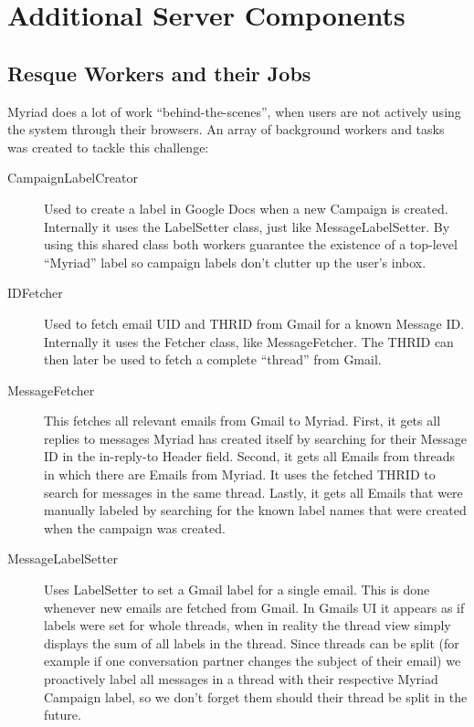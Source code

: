 \section{Additional Server Components}

\subsection{Resque Workers and their Jobs}

Myriad does a lot of work ``behind-the-scenes'', when users are not actively using the system through their browsers. An array of background workers and tasks was created to tackle this challenge:

\begin{description}

\item[CampaignLabelCreator] Used to create a label in Google Docs when a new Campaign is created. Internally it uses the LabelSetter class, just like MessageLabelSetter. By using this shared class both workers guarantee the existence of a top-level ``Myriad'' label so campaign labels don't clutter up the user's inbox.

\item[IDFetcher] Used to fetch email UID and THRID from Gmail for a known Message ID. Internally it uses the Fetcher class, like MessageFetcher. The THRID can then later be used to fetch a complete ``thread'' from Gmail.

\item[MessageFetcher] This fetches all relevant emails from Gmail to Myriad. First, it gets all replies to messages Myriad has created itself by searching for their Message ID in the in-reply-to Header field. Second, it gets all Emails from threads in which there are Emails from Myriad. It uses the fetched THRID to search for messages in the same thread. Lastly, it gets all Emails that were manually labeled by searching for the known label names that were created when the campaign was created.

\item[MessageLabelSetter] Uses LabelSetter to set a Gmail label for a single email. This is done whenever new emails are fetched from Gmail. In Gmails UI it appears as if labels were set for whole threads, when in reality the thread view simply displays the sum of all labels in the thread. Since threads can be split (for example if one conversation partner changes the subject of their email) we proactively label all messages in a thread with their respective Myriad Campaign label, so we don't forget them should their thread be split in the future.


\end{description}
